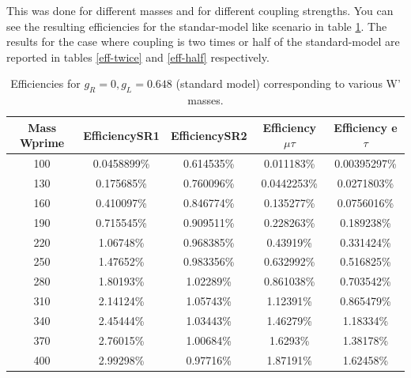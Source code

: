 This was done for different \wprime masses and for different coupling strengths. You can see the resulting efficiencies for the standar-model like scenario in table \ref{eff-SM}. The results for the case where coupling is two times or half of the standard-model are reported in tables \ref{eff-twice} and \ref{eff-half} respectively.

  \begin{table}[htb]
 	\centering
  	\begin{tabular}{|ccccc|}
  		\hline 
  		Mass Wprime & EfficiencySR1 & EfficiencySR2 & Efficiency $\mu$$\tau$ & Efficiency e $\tau$ \\
\hline 
  		100& 0.0458899\%& 0.614535\%& 0.011183\% & 0.00395297\%\\
 		130& 0.175685\%& 0.760096\%& 0.0442253\%& 0.0271803\%\\
  		160& 0.410097\%& 0.846774\%& 0.135277\%& 0.0756016\%\\
  		190& 0.715545\%& 0.909511\%& 0.228263\%& 0.189238\%\\
  		220& 1.06748\%& 0.968385\%& 0.43919\%& 0.331424\%\\
  		250& 1.47652\%& 0.983356\%& 0.632992\%& 0.516825\%\\ 
  		280& 1.80193\%& 1.02289\%& 0.861038\%& 0.703542\%\\
 		310& 2.14124\%& 1.05743\%& 1.12391\%& 0.865479\%\\
  		340& 2.45444\%& 1.03443\%& 1.46279\%& 1.18334\%\\ 
  		370& 2.76015\%& 1.00684\%& 1.6293\%& 1.38178\%\\
  		400& 2.99298\%& 0.97716\%& 1.87191\%& 1.62458\%\\

  		\hline
  	\end{tabular}
  	\caption{Efficiencies for $ g_R=0 , g_L=0.648 $ (standard model) corresponding to various W' masses. \label{eff-SM} }
  \end{table}


